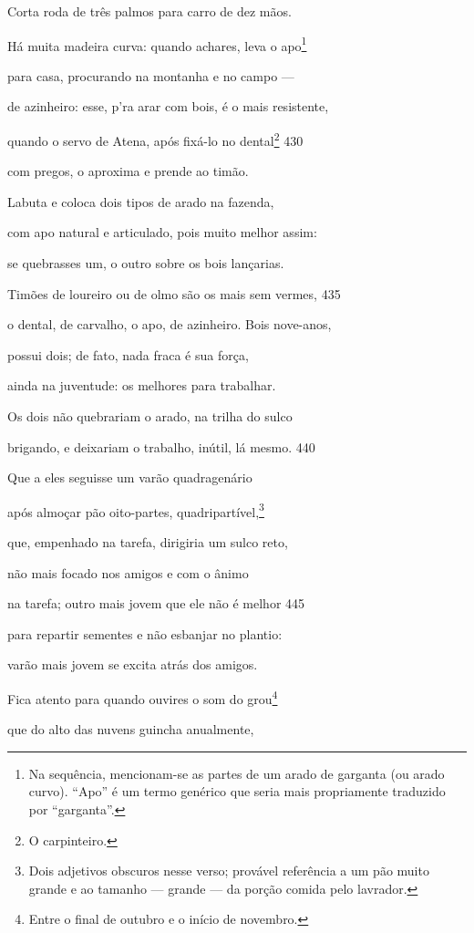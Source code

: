 Corta roda de três palmos para carro de dez mãos.

Há muita madeira curva: quando achares, leva o apo\footnote{Na sequência, mencionam-se as partes de um arado de garganta (ou
arado curvo). ``Apo'' é um termo genérico que seria mais propriamente
traduzido por ``garganta''.}

para casa, procurando na montanha e no campo ---

de azinheiro: esse, p'ra arar com bois, é o mais resistente,

quando o servo de Atena, após fixá-lo no dental\footnote{O carpinteiro.} \num{430}

com pregos, o aproxima e prende ao timão.

Labuta e coloca dois tipos de arado na fazenda,

com apo natural e articulado, pois muito melhor assim:

se quebrasses um, o outro sobre os bois lançarias.

Timões de loureiro ou de olmo são os mais sem vermes, \num{435}

o dental, de carvalho, o apo, de azinheiro. Bois nove-anos,

possui dois; de fato, nada fraca é sua força,

ainda na juventude: os melhores para trabalhar.

Os dois não quebrariam o arado, na trilha do sulco

brigando, e deixariam o trabalho, inútil, lá mesmo. \num{440}

Que a eles seguisse um varão quadragenário

após almoçar pão oito-partes, quadripartível,\footnote{Dois adjetivos obscuros nesse verso; provável referência a um pão muito grande e ao tamanho --- grande --- da porção comida pelo lavrador.}

que, empenhado na tarefa, dirigiria um sulco reto,

não mais focado nos amigos e com o ânimo

na tarefa; outro mais jovem que ele não é melhor \num{445}

para repartir sementes e não esbanjar no plantio:

varão mais jovem se excita atrás dos amigos.

Fica atento para quando ouvires o som do grou\footnote{Entre o final de outubro e o início de novembro.}

que do alto das nuvens guincha anualmente,

